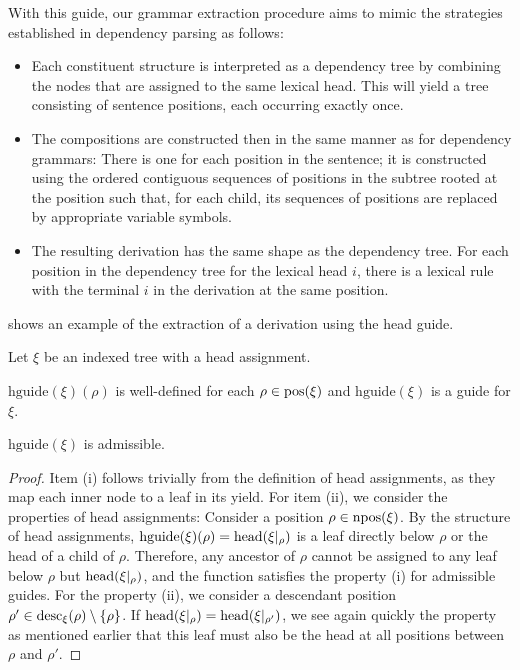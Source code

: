 \documentclass[../../document.tex]{subfiles}
\begin{document}
    With this guide, our grammar extraction procedure aims to mimic the strategies established in dependency parsing \citep{kuhlmann2009treebank} as follows:
    \begin{itemize}
        \item Each constituent structure is interpreted as a dependency tree by combining the nodes that are assigned to the same lexical head. This will yield a tree consisting of sentence positions, each occurring exactly once.
        \item The  compositions are constructed then in the same manner as for dependency grammars: There is one for each position in the sentence; it is constructed using the ordered contiguous sequences of positions in the subtree rooted at the position such that, for each child, its sequences of positions are replaced by appropriate variable symbols.
        \item The resulting derivation has the same shape as the dependency tree. For each position in the dependency tree for the lexical head \(i\), there is a lexical rule with the terminal \(i\) in the derivation at the same position.
    \end{itemize}
     shows an example of the extraction of a derivation using the head guide.

    \begin{theorem}
        Let \(\xi\) be an indexed tree with a head assignment.
        \begin{compactenum}
            \item \(\mathrm{hguide}(\xi)(\rho)\) is well-defined for each \(\rho \in \operatorname{pos}(\xi)\) and \(\mathrm{hguide}(\xi)\) is a guide for \(\xi\).
            \item \(\mathrm{hguide}(\xi)\) is admissible.
        \end{compactenum}
    \end{theorem}

    \begin{proof}
        Item (i) follows trivially from the definition of head assignments, as they map each inner node to a leaf in its yield.
        For item (ii), we consider the properties of head assignments:
        Consider a position \(\rho \in \operatorname{npos}(\xi)\).
        By the structure of head assignments, \(\mathrm{hguide}(\xi)(\rho) = \operatorname{head}(\xi|_\rho)\) is a leaf directly below \(\rho\) or the head of a child of \(\rho\).
        Therefore, any ancestor of \(\rho\) cannot be assigned to any leaf below \(\rho\) but \(\operatorname{head}(\xi|_\rho)\), and the function satisfies the property (i) for admissible guides.
        For the property (ii), we consider a descendant position \(\rho' \in \operatorname{desc}_\xi(\rho) \setminus \{\rho\}\).
        If \(\operatorname{head}(\xi|_\rho) = \operatorname{head}(\xi|_{\rho'})\), we see again quickly the property as mentioned earlier that this leaf must also be the head at all positions between \(\rho\) and \(\rho'\).
    \end{proof}
\end{document}
